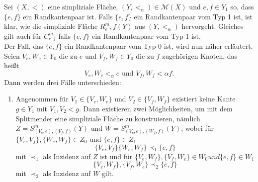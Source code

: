 \documentclass[12pt,titlepage]{article}
\begin{document}
\begin{bemerkung}
Sei $(X,<)$ eine simpliziale Fläche, $(Y,<_{\alpha})\in \mathcal{M}(X)$ und $e,f \in Y_1$ so, dass $\{e,f\}$ ein Randkantenpaar ist.
 Falls $\{e,f\}$ ein Randkantenpaar vom Typ 1 ist, ist klar, wie die simpliziale Fläche $R^m_e,f(Y)$ aus $(Y,<_{\alpha})$ hervorgeht. Gleiches gilt auch für $C^m_{e,f}$ falls $\{e,f\}$ ein Randkantenpaar vom Typ 1 ist.\\
Der Fall, das $\{e,f\}$ ein Randkantenpaar vom Typ 0 ist, wird nun näher erläutert.\\
Seien $V_e,W_e \in Y_0$ die zu $e$ und $V_f,W_f \in Y_0$ die zu $f$ zugehörigen Knoten, das heißt
\[
V_e,W_e <_{\alpha} e \text{ und } V_f,W_f<{\alpha} f.
\]  
Dann werden drei Fälle unterschieden:
\begin{enumerate}
\item Angenommen für $V_1\in \{V_e,W_e\}$ und $V_2 \in \{V_f,W_f\}$ existiert keine Kante $g \in Y_1$ mit $V_1,V_2 <g$. Dann existieren zwei Möglichkeiten, um mit dem Splitmender eine simpliziale Fläche zu konstruieren, nämlich $Z=S^m_{(V_e,e),(V_f,f)}(Y)$ und $W=S^m_{(V_e,e),(W_f,f)}(Y)$, 
wobei für $\{V_e,V_f\},\{W_e,W_f\} \in Z_0$ und $\{e,f\} \in Z_1$
\[
\{V_e,V_f\}\{W_e,W_f\}\prec_1 \{e,f\}
\]mit $\prec_1$ als Inzidenz auf $Z$ ist und für $\{V_e, W_f\},\{V_f,W_e\}\in W_0 und \{e,f\}\in W_1$
\[
\{V_e,W_f\},\{V_f,W_e\}\prec_2 \{e,f\} 
\] mit $\prec_2$ als Inzidenz auf $W$ gilt.
 \\
\end{enumerate}
\end{bemerkung}
\end{document}

